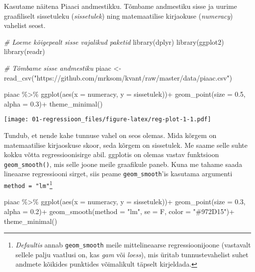 \documentclass[
]{book}
\newenvironment{Shaded}{\begin{snugshade}}{\end{snugshade}}
\newcommand{\AttributeTok}[1]{\textcolor[rgb]{0.77,0.63,0.00}{#1}}
\newcommand{\CommentTok}[1]{\textcolor[rgb]{0.56,0.35,0.01}{\textit{#1}}}
\newcommand{\FloatTok}[1]{\textcolor[rgb]{0.00,0.00,0.81}{#1}}
\newcommand{\FunctionTok}[1]{\textcolor[rgb]{0.00,0.00,0.00}{#1}}
\newcommand{\NormalTok}[1]{#1}
\newcommand{\OtherTok}[1]{\textcolor[rgb]{0.56,0.35,0.01}{#1}}
\newcommand{\SpecialCharTok}[1]{\textcolor[rgb]{0.00,0.00,0.00}{#1}}
\newcommand{\StringTok}[1]{\textcolor[rgb]{0.31,0.60,0.02}{#1}}
\begin{document}
Kasutame näitena Piaaci andmestikku. Tõmbame andmestiku sisse ja uurime graafiliselt sissetuleku (\emph{sissetulek}) ning matemaatilise kirjaokuse (\emph{numeracy}) vahelist seost.

\begin{Shaded}
\begin{Highlighting}[]
\CommentTok{\# Loeme kõigepealt sisse vajalikud paketid}
\FunctionTok{library}\NormalTok{(dplyr)}
\FunctionTok{library}\NormalTok{(ggplot2)}
\FunctionTok{library}\NormalTok{(readr)}

\CommentTok{\# Tõmbame  sisse andmestiku}
\NormalTok{piaac }\OtherTok{\textless{}{-}} \FunctionTok{read\_csv}\NormalTok{(}\StringTok{"https://github.com/mrksom/kvant/raw/master/data/piaac.csv"}\NormalTok{)}

\NormalTok{piaac }\SpecialCharTok{\%\textgreater{}\%} 
  \FunctionTok{ggplot}\NormalTok{(}\FunctionTok{aes}\NormalTok{(}\AttributeTok{x =}\NormalTok{ numeracy, }\AttributeTok{y =}\NormalTok{ sissetulek))}\SpecialCharTok{+}
  \FunctionTok{geom\_point}\NormalTok{(}\AttributeTok{size =} \FloatTok{0.5}\NormalTok{, }\AttributeTok{alpha =} \FloatTok{0.3}\NormalTok{)}\SpecialCharTok{+}
  \FunctionTok{theme\_minimal}\NormalTok{()}
\end{Highlighting}
\end{Shaded}

\texttt{[image: 01-regressioon\_files/figure-latex/reg-plot-1-1.pdf]}

Tundub, et nende kahe tunnuse vahel on seos olemas. Mida kõrgem on matemaatilise kirjaoskuse skoor, seda kõrgem on sissetulek. Me saame selle suhte kokku võtta regressioonisirge abil. ggplotis on olemas vastav funktsioon \texttt{geom\_smooth()}, mis selle joone meile graafikule paneb. Kuna me tahame saada lineaarse regressiooni sirget, siis peame \texttt{geom\_smooth}'is kasutama argumenti \texttt{method\ =\ "lm"}\footnote{\emph{Defaultis} annab \texttt{geom\_smooth} meile mittelineaarse regressioonijoone (vastavalt sellele palju vaatlusi on, kas \emph{gam} või \emph{loess}), mis üritab tunnustevahelist suhet andmete kõikides punktides võimalikult täpselt kirjeldada.}

\begin{Shaded}
\begin{Highlighting}[]
\NormalTok{piaac }\SpecialCharTok{\%\textgreater{}\%} 
  \FunctionTok{ggplot}\NormalTok{(}\FunctionTok{aes}\NormalTok{(}\AttributeTok{x =}\NormalTok{ numeracy, }\AttributeTok{y =}\NormalTok{ sissetulek))}\SpecialCharTok{+}
  \FunctionTok{geom\_point}\NormalTok{(}\AttributeTok{size =} \FloatTok{0.3}\NormalTok{, }\AttributeTok{alpha =} \FloatTok{0.2}\NormalTok{)}\SpecialCharTok{+}
  \FunctionTok{geom\_smooth}\NormalTok{(}\AttributeTok{method =} \StringTok{"lm"}\NormalTok{, }\AttributeTok{se =}\NormalTok{ F, }\AttributeTok{color =} \StringTok{"\#972D15"}\NormalTok{)}\SpecialCharTok{+}
  \FunctionTok{theme\_minimal}\NormalTok{()}
\end{Highlighting}
\end{Shaded}
\end{document}
